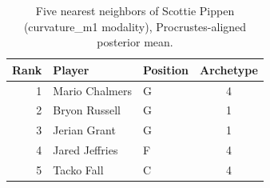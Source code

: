 \begin{table}[htbp]
  \centering\small
  \begin{tabular}{rllc}
    \toprule
    Rank & Player & Position & Archetype \\
    \midrule
    1 & Mario Chalmers & G & 4 \\
    2 & Bryon Russell & G & 1 \\
    3 & Jerian Grant & G & 1 \\
    4 & Jared Jeffries & F & 4 \\
    5 & Tacko Fall & C & 4 \\
    \bottomrule
  \end{tabular}
  \caption{Five nearest neighbors of Scottie Pippen (curvature_m1 modality), Procrustes-aligned posterior mean.}
  \label{tab:Scottie_Pippen_neighbors_curvature_m1}
\end{table}

